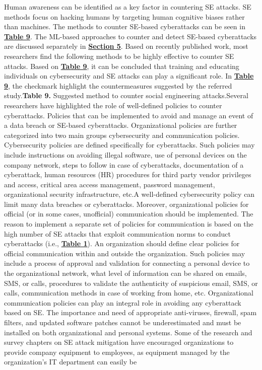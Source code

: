 {Human awareness can be identified as a key factor in countering SE attacks. SE methods focus on hacking humans by targeting human cognitive biases rather than machines. The methods to counter SE-based cyberattacks can be seen in \href{https://www.mdpi.com/2076-3417/12/12/6042\#table_body_display_applsci-12-06042-t009}{\textbf{Table 9}}. The ML-based approaches to counter and detect SE-based cyberattacks are discussed separately in \href{https://www.mdpi.com/2076-3417/12/12/6042\#sec5-applsci-12-06042}{\textbf{Section 5}}. Based on recently published work, most researchers find the following methods to be highly effective to counter SE attacks. Based on \href{https://www.mdpi.com/2076-3417/12/12/6042\#table_body_display_applsci-12-06042-t009}{\textbf{Table 9}}, it can be concluded that training and educating individuals on cybersecurity and SE attacks can play a significant role. In \href{https://www.mdpi.com/2076-3417/12/12/6042\#table_body_display_applsci-12-06042-t009}{\textbf{Table 9}}, the checkmark highlight the countermeasures suggested by the referred study.\textbf{Table 9.} Suggested method to counter social engineering attacks.Several researchers have highlighted the role of well-defined policies to counter cyberattacks. Policies that can be implemented to avoid and manage an event of a data breach or SE-based cyberattacks. Organizational policies are further categorized into two main groups cybersecurity and communication policies. Cybersecurity policies are defined specifically for cyberattacks. Such policies may include instructions on avoiding illegal software, use of personal devices on the company network, steps to follow in case of cyberattacks, documentation of a cyberattack, human resources (HR) procedures for third party vendor privileges and access, critical area access management, password management, organizational security infrastructure, etc.A well-defined cybersecurity policy can limit many data breaches or cyberattacks. Moreover, organizational policies for official (or in some cases, unofficial) communication should be implemented. The reason to implement a separate set of policies for communication is based on the high number of SE attacks that exploit communication norms to conduct cyberattacks (i.e., \href{https://www.mdpi.com/2076-3417/12/12/6042\#table_body_display_applsci-12-06042-t001}{\textbf{Table 1}}). An organization should define clear policies for official communication within and outside the organization. Such policies may include a process of approval and validation for connecting a personal device to the organizational network, what level of information can be shared on emails, SMS, or calls, procedures to validate the authenticity of suspicious email, SMS, or calls, communication methods in case of working from home, etc. Organizational communication policies can play an integral role in avoiding any cyberattack based on SE. The importance and need of appropriate anti-viruses, firewall, spam filters, and updated software patches cannot be underestimated and must be installed on both organizational and personal systems. Some of the research and survey chapters on SE attack mitigation have encouraged organizations to provide company equipment to employees, as equipment managed by the organization’s IT department can easily be }
